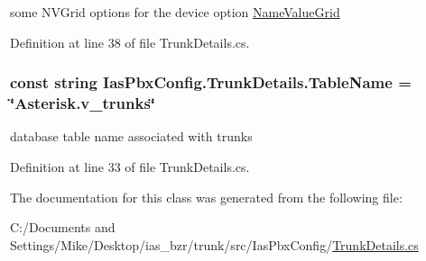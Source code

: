 some NVGrid options for the device option \hyperlink{class_ias_pbx_config_1_1_name_value_grid}{NameValueGrid} 

Definition at line 38 of file TrunkDetails.cs.\hypertarget{class_ias_pbx_config_1_1_trunk_details_aa073b291eda0041622361db624283b0b}{
\subsubsection[{TableName}]{\setlength{\rightskip}{0pt plus 5cm}const string {\bf IasPbxConfig.TrunkDetails.TableName} = \char`\"{}Asterisk.v\_\-trunks\char`\"{}}}
\label{class_ias_pbx_config_1_1_trunk_details_aa073b291eda0041622361db624283b0b}


database table name associated with trunks 

Definition at line 33 of file TrunkDetails.cs.

The documentation for this class was generated from the following file:\begin{DoxyCompactItemize}
\item 
C:/Documents and Settings/Mike/Desktop/ias\_\-bzr/trunk/src/IasPbxConfig/\hyperlink{_trunk_details_8cs}{TrunkDetails.cs}\end{DoxyCompactItemize}
